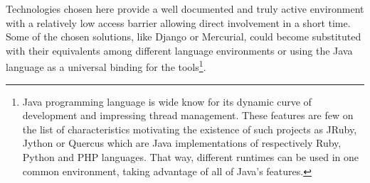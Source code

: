 Technologies chosen here provide a well documented and truly active environment with a relatively low access barrier allowing direct involvement in a short time. Some of the chosen solutions, like Django or Mercurial, could become substituted with their equivalents among different language environments or using the Java language as a universal binding for the tools\footnote{Java programming language is wide know for its dynamic curve of development and impressing thread management. These features are few on the list of characteristics motivating the existence of such projects as JRuby, Jython or Quercus which are Java implementations of respectively Ruby, Python and PHP languages. That way, different runtimes can be used in one common environment, taking advantage of all of Java’s features.}.       
\begin{figure}[ht]
  \begin{center}

\end{center}
\end{figure}
